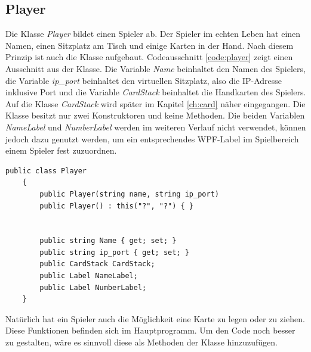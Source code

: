 \subsection{Player}
Die Klasse \textit{Player} bildet einen Spieler ab. Der Spieler im echten Leben hat einen Namen, einen Sitzplatz am Tisch und einige Karten in der Hand. Nach diesem Prinzip ist auch die Klasse aufgebaut. Codeausschnitt \ref{code:player} zeigt einen Ausschnitt aus der Klasse. Die Variable \textit{Name} beinhaltet den Namen des Spielers, die Variable \textit{ip\_port} beinhaltet den virtuellen Sitzplatz, also die IP-Adresse inklusive Port und die Variable \textit{CardStack} beinhaltet die Handkarten des Spielers. Auf die Klasse \textit{CardStack} wird später im Kapitel \ref{ch:card} näher eingegangen. Die Klasse besitzt nur zwei Konstruktoren und keine Methoden. Die beiden Variablen \textit{NameLabel} und \textit{NumberLabel} werden im weiteren Verlauf nicht verwendet, können jedoch dazu genutzt werden, um ein entsprechendes WPF-Label im Spielbereich einem Spieler fest zuzuordnen.
\begin{lstlisting}[label=code:player, caption={Klasse \textit{Player}}]
 	public class Player
	{
		public Player(string name, string ip_port)
		public Player() : this("?", "?") { }
		
		
		public string Name { get; set; }
		public string ip_port { get; set; }
		public CardStack CardStack;
		public Label NameLabel;
		public Label NumberLabel;
	}
\end{lstlisting}
Natürlich hat ein Spieler auch die Möglichkeit eine Karte zu legen oder zu ziehen. Diese Funktionen befinden sich im Hauptprogramm. Um den Code noch besser zu gestalten, wäre es sinnvoll diese als Methoden der Klasse hinzuzufügen.

